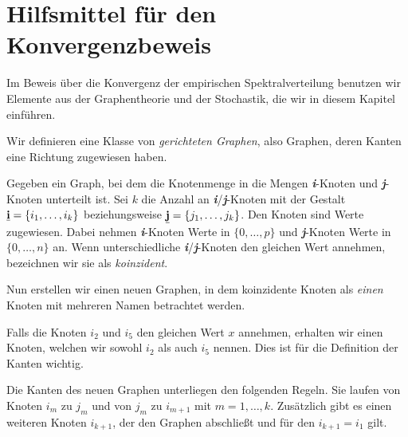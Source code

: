 \documentclass[../Bachelor_LennartKoliwer.tex]{subfiles}
\begin{document}



















\section{Hilfsmittel für den Konvergenzbeweis}


Im Beweis über die Konvergenz der empirischen Spektralverteilung benutzen wir Elemente aus der Graphentheorie und der Stochastik, die wir in diesem Kapitel einführen.

Wir definieren eine Klasse von \emph{gerichteten Graphen}, also Graphen, deren Kanten eine Richtung zugewiesen haben.

Gegeben ein Graph, bei dem die Knotenmenge in die Mengen \emph{\textbf{i}}-Knoten und \emph{\textbf{j}}-Knoten unterteilt ist.
Sei $k$ die Anzahl an \emph{\textbf{i}}/\emph{\textbf{j}}-Knoten mit der Gestalt $\emph{\textbf{i}}=\{i_1,\dots,i_k\}$ beziehungsweise $\emph{\textbf{j}}=\{j_1,\dots,j_k\}$.
Den Knoten sind Werte zugewiesen.
Dabei nehmen \emph{\textbf{i}}-Knoten Werte in $\{0,\dots,p\}$ und \emph{\textbf{j}}-Knoten Werte in $\{0,\dots,n\}$ an.
Wenn unterschiedliche \emph{\textbf{i}}/\emph{\textbf{j}}-Knoten den gleichen Wert annehmen, bezeichnen wir sie als \emph{koinzident}.

Nun erstellen wir einen neuen Graphen, in dem koinzidente Knoten als \emph{einen} Knoten mit mehreren Namen betrachtet werden.

\begin{example}
    Falls die Knoten $i_2$ und $i_5$ den gleichen Wert $x$ annehmen, erhalten wir einen Knoten, welchen wir sowohl $i_2$ als auch $i_5$ nennen.
    Dies ist für die Definition der Kanten wichtig.
\end{example}

Die Kanten des neuen Graphen unterliegen den folgenden Regeln.
Sie laufen von Knoten $i_m$ zu $j_m$ und von $j_m$ zu $i_{m+1}$ mit $m=1,\dots,k$.
Zusätzlich gibt es einen weiteren Knoten $i_{k+1}$, der den Graphen abschließt und für den $i_{k+1}=i_1$ gilt.
\end{document}
